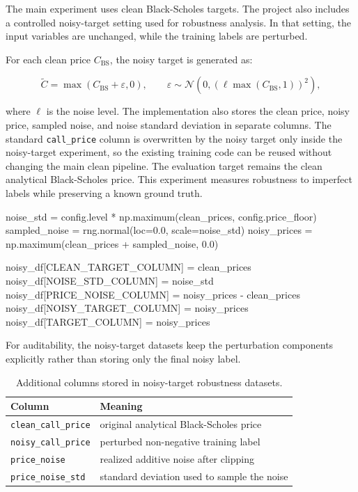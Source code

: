 The main experiment uses clean Black-Scholes targets.
The project also includes a controlled noisy-target setting used for robustness analysis.
In that setting, the input variables are unchanged, while the training labels are perturbed.

For each clean price $C_{\mathrm{BS}}$, the noisy target is generated as:

\begin{equation}
    \widetilde{C}
    =
    \max\left(
    C_{\mathrm{BS}} + \varepsilon,
    0
    \right),
    \qquad
    \varepsilon \sim
    \mathcal{N}\left(
    0,
    \left(\ell \max(C_{\mathrm{BS}}, 1)\right)^2
    \right),
\end{equation}

where $\ell$ is the noise level.
The implementation also stores the clean price, noisy price, sampled noise, and noise standard deviation in separate columns.
The standard \texttt{call\_price} column is overwritten by the noisy target only inside the noisy-target experiment, so the existing training code can be reused without changing the main clean pipeline.
The evaluation target remains the clean analytical Black-Scholes price.
This experiment measures robustness to imperfect labels while preserving a known ground truth.

\begin{projectlistingbox}
noise_std = config.level * np.maximum(clean_prices, config.price_floor)
sampled_noise = rng.normal(loc=0.0, scale=noise_std)
noisy_prices = np.maximum(clean_prices + sampled_noise, 0.0)

noisy_df[CLEAN_TARGET_COLUMN] = clean_prices
noisy_df[NOISE_STD_COLUMN] = noise_std
noisy_df[PRICE_NOISE_COLUMN] = noisy_prices - clean_prices
noisy_df[NOISY_TARGET_COLUMN] = noisy_prices
noisy_df[TARGET_COLUMN] = noisy_prices
\end{projectlistingbox}

For auditability, the noisy-target datasets keep the perturbation components explicitly rather than storing only the final noisy label.

\begin{table}[H]
    \centering
    \begin{tabular}{ll}
        \toprule
        Column & Meaning \\
        \midrule
        \texttt{clean\_call\_price} & original analytical Black-Scholes price \\
        \texttt{noisy\_call\_price} & perturbed non-negative training label \\
        \texttt{price\_noise} & realized additive noise after clipping \\
        \texttt{price\_noise\_std} & standard deviation used to sample the noise \\
        \bottomrule
    \end{tabular}
    \caption{Additional columns stored in noisy-target robustness datasets.}
    \label{tab:noisy-columns}
\end{table}

